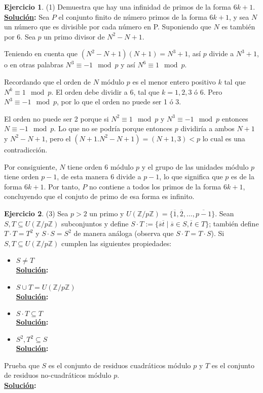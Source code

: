 \documentclass[11pt,letterpaper]{article}
\theoremstyle{definition}\newtheorem{p}{Ejercicio}
\newcommand{\Z}{\mathbb{Z}}
\newcommand{\clase}[1]{\overline{#1}}  %
\newcommand{\sol}{\textbf{\underline{Solución}: }} %
\begin{document}
\begin{p}(1)
Demuestra que hay una infinidad de primos de la forma $6k+1$.\\
\sol Sea $P$ el conjunto finito de número primos de la forma $6k+1$, y sea $N$ un número que es 
divisible por cada número en P. Suponiendo que $N$ es también por 6. Sea $p$ un primo divisor de 
$N^2 - N + 1$.

Teniendo en cuenta que $(N^2 - N + 1)(N+1) = N^3 +1$, así $p$ divide a $N^3 +1$, o en otras palabras
$N^3 \equiv -1 \mod p$ y así $N^6 \equiv 1 \mod p$.

Recordando que el orden de $N$ módulo $p$ es el menor entero positivo $k$ tal que $N^k \equiv 1 \mod p$.
El orden debe dividir a 6, tal que $k = 1,2,3$ ó 6. Pero $N^3 \equiv -1 \mod p$, por lo que el 
orden no puede ser 1 ó 3.

El orden no puede ser 2 porque si $N^2 \equiv 1 \mod p$ y $N^3 \equiv -1 \mod p$ entonces 
$N \equiv -1 \mod p$. Lo que no se podría porque entonces $p$ dividiría a ambos $N+1$ y
$N^2 - N+1$, pero el $(N+1. N^2 - N +1) = (N+1, 3) < p$ lo cual es una contradicción.

Por consiguiente, $N$ tiene orden 6 módulo $p$ y el grupo de las unidades módulo $p$ tiene orden $p-1$,
de esta manera 6 divide a $p-1$, lo que significa que $p$ es de la forma $6k+1$. Por tanto,
$P$ no contiene a todos los primos de la forma $6k+1$, concluyendo que el conjuto de primo de esa
forma es infinito.
\end{p}


\begin{p}(3)
Sea $p>2$ un primo y $U(\Z/p\Z)=\{\clase{1},\clase{2},\ldots,\clase{p-1}\}$. Sean
$S,T\subseteq U(\Z/p\Z)$ subconjuntos y define
$S\cdot T:=\{\clase{s}\clase{t}\mid \clase{s}\in S,\clase{t}\in T\}$; tambi\'en define
$T\cdot T=T^2$ y $S\cdot S=S^2$ de manera an\'aloga (observa que $S\cdot T=T\cdot S$). Si
$S,T\subseteq U(\Z/p\Z)$ cumplen las siguientes propiedades:
\begin{itemize}
  \item $S\neq T$\\
  \sol

  \item $S\cup T=U(\Z/p\Z)$\\
  \sol
  
  \item $S\cdot T\subseteq T$\\
  \sol
  
  \item $S^2,T^2\subseteq S$ \\
  \sol

\end{itemize}

Prueba que $S$ es el conjunto de residuos cuadr\'aticos m\'odulo $p$ y $T$ es el conjunto de
residuos no-cuadr\'aticos m\'odulo $p$.\\
\sol

\end{p}
\end{document}
